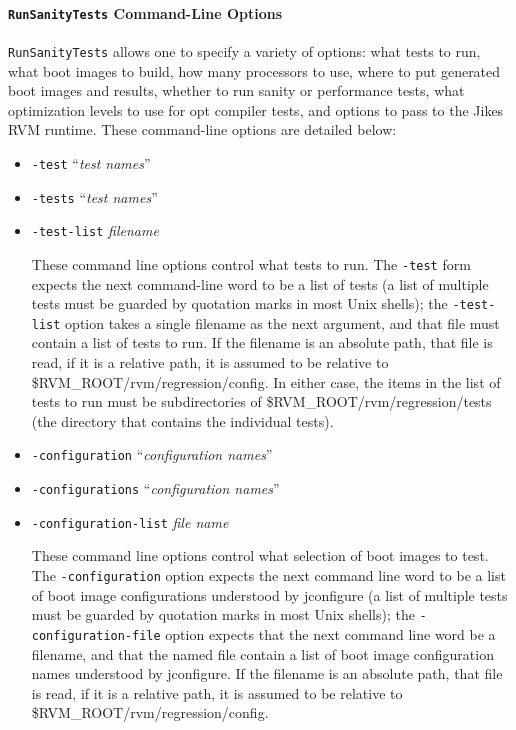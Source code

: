 \paragraph{{\tt{RunSanityTests}} Command-Line Options}

 {\tt{RunSanityTests}} allows one to specify a variety of options:
what tests to run, what boot images to build, how many processors to
use, where to put generated boot images and results, whether to run
sanity or performance tests, what optimization levels to use for opt
compiler tests, and options to pass to the Jikes RVM runtime.  These
command-line options are detailed below:

\begin{itemize}
\item{\tt{-test}} ``{\em{test names}}''
\item{\tt{-tests}} ``{\em{test names}}''
\item{\tt{-test-list}} {\em{filename}}

 These command line options control what tests to run.  The
{\tt{-test}} form expects the next command-line word to be a list
of tests (a list of multiple tests must be guarded by quotation marks
in most Unix shells); the {\tt{-test-list}} option takes a single
filename as the next argument, and that file must contain a list of
tests to run.  If the filename is an absolute path, that file is read,
if it is a relative path, it is assumed to be relative to
\$RVM\_ROOT/rvm/regression/config.  In either case, the items in the
list of tests to run must be subdirectories of
\$RVM\_ROOT/rvm/regression/tests (the directory that contains the
individual tests).

\item{\tt{-configuration}} ``{\em{configuration names}}''
\item{\tt{-configurations}} ``{\em{configuration names}}''
\item{\tt{-configuration-list}} {\em{file name}}

 These command line options control what selection of boot images to
test.  The {\tt{-configuration}} option expects the next command
line word to be a list of boot image configurations understood by
jconfigure (a list of multiple tests must be guarded by quotation
marks in most Unix shells); the {\tt{-configuration-file}} option
expects that the next command line word be a filename, and that the
named file contain a list of boot image configuration names understood
by jconfigure.  If the filename is an absolute path, that file is
read, if it is a relative path, it is assumed to be relative to
\$RVM\_ROOT/rvm/regression/config.


\end{itemize}
